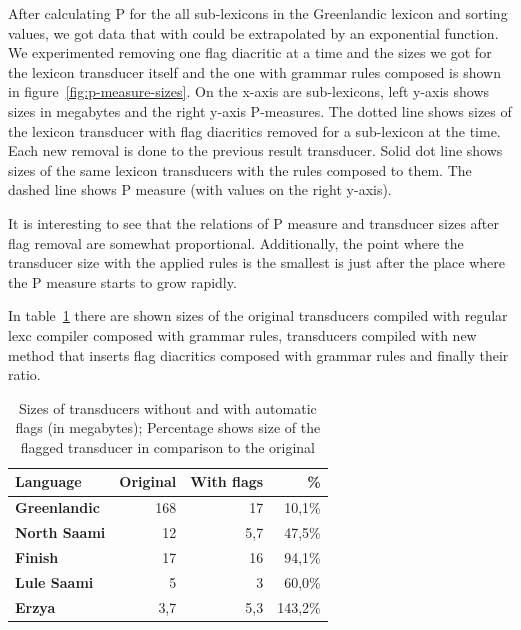 \documentclass[10pt, a4paper]{article}
\begin{document}
After calculating P for the all sub-lexicons in the Greenlandic lexicon and sorting values, we got data 
that with could be extrapolated by an exponential function. We experimented removing one flag diacritic at a 
time and the sizes we got for the lexicon transducer itself and the one with grammar rules composed is shown in 
figure~\ref{fig:p-measure-sizes}. On the x-axis are sub-lexicons, left y-axis shows sizes in megabytes and the right 
y-axis P-measures. The dotted line shows sizes of the lexicon transducer with flag diacritics removed for 
a sub-lexicon at the time. Each new removal is done to the previous result transducer. Solid dot line shows sizes of the same lexicon transducers with the rules composed to them. 
The dashed line shows P measure (with values on the right y-axis).  
  
It is interesting to see that the relations of P measure and transducer sizes after flag removal are somewhat proportional. 
Additionally, the point where the transducer size with the applied rules is the smallest is just after the place where 
the P measure starts to grow rapidly. 









In table~\ref{table:sizes} there are shown sizes of the original
transducers compiled with regular lexc compiler composed with grammar rules, transducers compiled
with new method that inserts flag diacritics composed with grammar rules and finally their ratio.

\begin{table}
    \centering
    \begin{tabular}{|l|r|r|r|}
        \hline
        \bf Language & \bf Original & \bf With flags & \bf \% \\
        \hline\hline
        \bf Greenlandic &   168   & 17 & 10,1\%  \\
        \bf North Saami &   12     & 5,7 & 47,5\%  \\
        \bf Finish &   17     & 16 & 94,1\%  \\
        \bf Lule Saami  &   5     & 3 & 60,0\%  \\
        \bf Erzya       &   3,7     & 5,3 & 143,2\%  \\
        \hline
    \end{tabular}
    \caption{Sizes of transducers without and with automatic flags (in megabytes); Percentage shows size of the flagged transducer in comparison to the original
    \label{table:sizes}}
\end{table}
\end{document}
